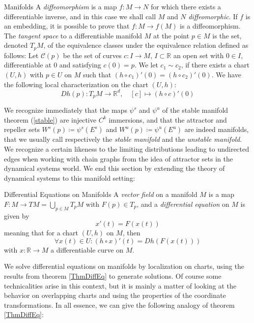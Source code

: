 \documentclass[11pt, a4paper]{memoir}
\theoremstyle{break}
\theoremstyle{break}
\theoremstyle{nonumberplain}
\newcommand{\mR}{\mathbb{R}}
\begin{document}
\begin{mydefinition}{Manifolds}
A \emph{diffeomorphism} is a map $f:M\to N$ for which there exists a differentiable inverse, and in this case we shall call $M$ and $N$ \emph{diffeomorphic}. If $f$ is an embedding, it is possible to prove that $f:M\to f(M)$ is a diffeomorphism.\\[5pt]
The \emph{tangent space} to a differentiable manifold $M$ at the point $p\in M$ is the set, denoted $T_pM$, of the equivalence classes under the equivalence relation defined as follows: Let $\mathcal{C}(p)$ be the set of curves $c:I\to M$, $I\subset \mR$ an open set with $0\in I$, differentiable at $0$ and satisfying $c(0)=p$. We let $c_1\sim c_2$, if there exists a chart $(U,h)$ with $p\in U$ on $M$ such that $(h\circ c_1)'(0)=(h\circ c_2)'(0)$. We have the following local characterization on the chart $(U,h)$:
$$Dh(p):T_pM\to\mR^d,\quad [c]\mapsto (h\circ c)'(0)$$
\end{mydefinition}
\noindent We recognize immediately that the maps $\psi^s$ and $\psi^u$ of the stable manifold theorem (\ref{stable}) are injective $C^k$ immersions, and that the attractor and repeller sets $W^s(p)\coloneqq \psi^s(E^s)$ and $W^u(p)\coloneqq \psi^u(E^u)$ are indeed manifolds, that we usually call respectively the \emph{stable manifold} and the \emph{unstable manifold}. We recognize a certain likeness to the limiting distributions leading to undirected edges when working with chain graphs from the idea of attractor sets in the dynamical systems world. We end this section by extending the theory of dynamical systems to this manifold setting:
\begin{mydefinition}{Differential Equations on Manifolds}
A \emph{vector field} on a manifold $M$ is a map $F:M\to TM=\bigcup_{p\in M}T_pM$ with $F(p)\in T_p$, and a \emph{differential equation} on $M$ is given by
\begin{equation}\label{diffeqmanif}
x'(t)=F(x(t))
\end{equation}
meaning that for a chart $(U,h)$ on $M$, then
$$\forall x(t)\in U: (h\circ x)'(t)=Dh(F(x(t)))$$
with $x:\mR\to M$ a differentiable curve on $M$.
\end{mydefinition}
We solve differential equations on manifolds by localization on charts, using the results from theorem \ref{ThmDiffEq} to generate solutions. Of course some technicalities arise in this context, but it is mainly a matter of looking at the behavior on overlapping charts and using the properties of the coordinate transformations. In all essence, we can give the following analogy of theorem \ref{ThmDiffEq}:
\end{document}
